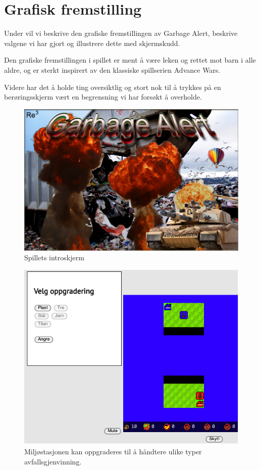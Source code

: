 \section{Grafisk fremstilling}\label{sec:artwork}
Under vil vi beskrive den grafiske fremstillingen av Garbage Alert, beskrive valgene vi har gjort og illustrere dette med skjermskudd.

Den grafiske fremstillingen i spillet er ment å være leken og rettet mot barn i alle aldre, og er sterkt inspirert av den klassiske spillserien Advance Wars.

Videre har det å holde ting oversiktlig og stort nok til å trykkes på en berøringsskjerm vært en begrensning vi har forsøkt å overholde.


\begin{figure}
\centering
\includegraphics[width=\textwidth]{images/splashscreen.png}
\caption{Spillets introskjerm}
\label{fig:splashscreen}
\end{figure}

\begin{figure}
\centering
\includegraphics[width=\textwidth]{images/Oppgradering.png}
\caption{Miljøstasjonen kan oppgraderes til å håndtere ulike typer avfallsgjenvinning.}
\label{fig:Oppgradering}
\end{figure}

